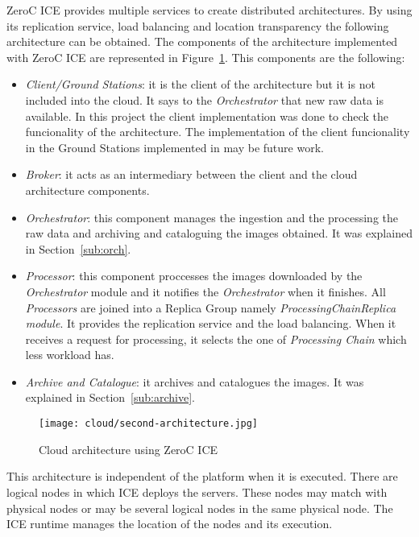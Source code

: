 ZeroC ICE provides multiple services to create distributed
architectures. By using its replication service, load balancing and location
transparency the following architecture can be obtained.
The components of the architecture implemented with ZeroC ICE are represented in Figure~\ref{fig:ice-architecture}. This components are the
following:

\begin{itemize}
\item \emph{Client/Ground Stations}: it is the client of the architecture but it
  is not included into the cloud. It says to the \emph{Orchestrator} that new raw data is available. In this
  project the client implementation was done to check the funcionality of the
  architecture. The implementation of the client
  funcionality in the Ground Stations implemented in \vw may be future work.
\item \emph{Broker}: it acts as an intermediary between the client and the cloud architecture
  components. 
\item \emph{Orchestrator}: this component manages the ingestion and the
  processing the raw data and archiving and cataloguing the images obtained. It was explained in Section~\ref{sub:orch}.
\item \emph{Processor}: this component proccesses the images downloaded by the
  \emph{Orchestrator} module and it notifies the \emph{Orchestrator} when it
  finishes. All \emph{Processors} are joined into a Replica Group namely
  \emph{ProcessingChainReplica module}. It provides the replication service and the load
  balancing. When it receives a request for processing, it selects the one of \emph{Processing Chain} which less workload has.
\item \emph{Archive and Catalogue}: it archives and catalogues the images. It was explained in Section~\ref{sub:archive}.
\end{itemize}

\begin{figure}[!h]
\begin{center}
\texttt{[image: cloud/second-architecture.jpg]}
\caption{Cloud architecture using ZeroC ICE}
\label{fig:ice-architecture}
\end{center}
\end{figure}

This architecture is independent of the platform when it is executed. There are
logical nodes in which ICE deploys the servers. These nodes may match with
physical nodes or may be several logical nodes in the same physical node. The
ICE runtime manages the location of the nodes and its execution.

